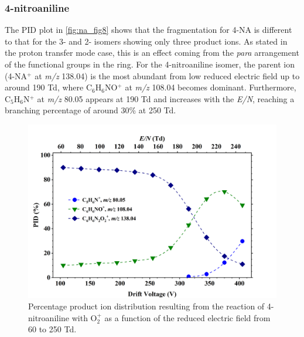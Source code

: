 \subsubsection{4-nitroaniline}
The PID plot in \autoref{fig:na_fig8} shows that the fragmentation for 4-NA is different to that for the 3- and 2- isomers showing only three product ions.  
As stated in the proton transfer mode case, this is an effect coming from the \textit{para} arrangement of the functional groups in the ring.
For the 4-nitroaniline isomer, the parent ion (4-NA$^+$ at \textit{m/z} 138.04) is the most abundant from low reduced electric field up to around 190 Td, where C$_6$H$_6$NO$^+$ at \textit{m/z} 108.04 becomes dominant.
Furthermore, C$_5$H$_6$N$^+$ at \textit{m/z} 80.05 appears at 190 Td and increases with the \textit{E/N}, reaching a branching percentage of around 30\% at 250 Td.

\begin{figure}%
\centering
\includegraphics[height=0.35\textheight]{pics/nitros_paper_8.png}
\caption{Percentage product ion distribution resulting from the reaction of 4-nitroaniline with O$_2^+$ as a function of the reduced electric field from 60 to 250 Td.}
\label{fig:na_fig8}
\end{figure}


